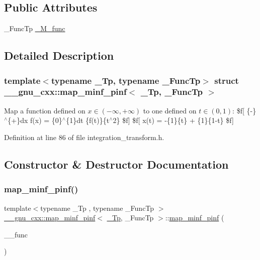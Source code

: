 \subsection*{Public Attributes}
\begin{DoxyCompactItemize}
\item 
\+\_\+\+Func\+Tp \hyperlink{struct____gnu__cxx_1_1map__minf__pinf_a38f287d24e3b40dc964637ac5e8f2532}{\+\_\+\+M\+\_\+func}
\end{DoxyCompactItemize}


\subsection{Detailed Description}
\subsubsection*{template$<$typename \+\_\+\+Tp, typename \+\_\+\+Func\+Tp$>$\newline
struct \+\_\+\+\_\+gnu\+\_\+cxx\+::map\+\_\+minf\+\_\+pinf$<$ \+\_\+\+Tp, \+\_\+\+Func\+Tp $>$}

Map a function defined on $ x \in (-\infty, +\infty) $ to one defined on $ t \in (0, 1) $\+: \$f\mbox{[} \{-\/\}$^\wedge$\{+\}dx f(x) = \{0\}$^\wedge$\{1\}dt \{f(t)\}\{t$^\wedge$2\} \$f\mbox{]} \$f\mbox{[} x(t) = -\/\{1\}\{t\} + \{1\}\{1-\/t\} \$f\mbox{]} 

Definition at line 86 of file integration\+\_\+transform.\+h.



\subsection{Constructor \& Destructor Documentation}
\mbox{\label{struct____gnu__cxx_1_1map__minf__pinf_a7ffd9d3da4cb973ffe3f2fc6423f5491}} 
\subsubsection{\texorpdfstring{map\+\_\+minf\+\_\+pinf()}{map\_minf\_pinf()}}
{\footnotesize\ttfamily template$<$typename \+\_\+\+Tp , typename \+\_\+\+Func\+Tp $>$ \\
\hyperlink{struct____gnu__cxx_1_1map__minf__pinf}{\+\_\+\+\_\+gnu\+\_\+cxx\+::map\+\_\+minf\+\_\+pinf}$<$ \hyperlink{namespace____gnu__cxx_a3b19a9c800ca194374ef9172290f7d79}{\+\_\+\+Tp}, \+\_\+\+Func\+Tp $>$\+::\hyperlink{struct____gnu__cxx_1_1map__minf__pinf}{map\+\_\+minf\+\_\+pinf} (\begin{DoxyParamCaption}\item[{\+\_\+\+Func\+Tp}]{\+\_\+\+\_\+func }\end{DoxyParamCaption})\hspace{0.3cm}{\ttfamily [inline]}}



